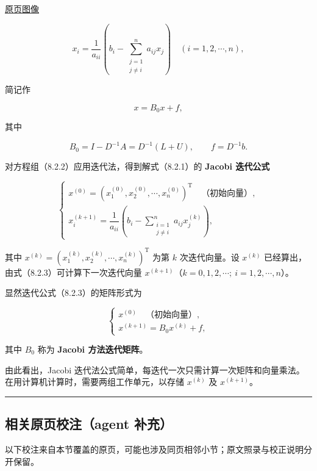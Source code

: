 \documentclass[
  10pt,
  fontset=fandol]{ctexart}
\begin{document}
\href{../../source-images/pdf-218.jpeg}{原页图像}

\[
x_i=\frac1{a_{ii}}\left(b_i-\sum_{\substack{j=1\\j\neq i}}^n a_{ij}x_j\right)\quad(i=1,2,\cdots,n),
\tag{8.2.2}
\]

简记作

\[
x=B_0x+f,
\]

其中

\[
B_0=I-D^{-1}A=D^{-1}(L+U),\qquad f=D^{-1}b.
\]

对方程组（8.2.2）应用迭代法，得到解式（8.2.1）的 \textbf{Jacobi 迭代公式}

\[
\begin{cases}
x^{(0)}=(x_1^{(0)},x_2^{(0)},\cdots,x_n^{(0)})^{\mathrm T}\quad\text{（初始向量）},\\[4pt]
x_i^{(k+1)}=\dfrac1{a_{ii}}\left(b_i-\displaystyle\sum_{\substack{i=1\\j\neq i}}^n a_{ij}x_j^{(k)}\right),
\end{cases}
\tag{8.2.3}
\]

其中 \(x^{(k)}=(x_1^{(k)},x_2^{(k)},\cdots,x_n^{(k)})^{\mathrm T}\) 为第 \(k\) 次迭代向量。设 \(x^{(k)}\) 已经算出，由式（8.2.3）可计算下一次迭代向量 \(x^{(k+1)}\)（\(k=0,\allowbreak 1,\allowbreak 2,\allowbreak \cdots;\ i=1,\allowbreak 2,\allowbreak \cdots,\allowbreak n\)）。

显然迭代公式（8.2.3）的矩阵形式为

\[
\begin{cases}
x^{(0)}\quad\text{（初始向量）},\\
x^{(k+1)}=B_0x^{(k)}+f,
\end{cases}
\tag{8.2.4}
\]

其中 \(B_0\) 称为 \textbf{Jacobi 方法迭代矩阵}。

由此看出，Jacobi 迭代法公式简单，每迭代一次只需计算一次矩阵和向量乘法。在用计算机计算时，需要两组工作单元，以存储 \(x^{(k)}\) 及 \(x^{(k+1)}\)。

\begin{center}\rule{0.5\linewidth}{0.5pt}\end{center}

\subsection{相关原页校注（agent 补充）}\label{ux76f8ux5173ux539fux9875ux6821ux6ce8agent-ux8865ux5145}

以下校注来自本节覆盖的原页，可能也涉及同页相邻小节；原文照录与校正说明分开保留。
\end{document}
